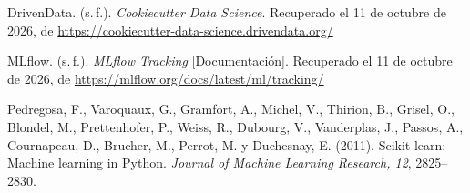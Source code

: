 \documentclass[11pt,letterpaper]{article}
\newcommand{\referencia}[1]{\noindent\hangindent=1.27cm\hangafter=1 #1\par\vspace{4pt}}
\begin{document}
\referencia{DrivenData. (s.\,f.). \textit{Cookiecutter Data Science}. Recuperado el 11 de
octubre de 2026, de \url{https://cookiecutter-data-science.drivendata.org/}}

\referencia{MLflow. (s.\,f.). \textit{MLflow Tracking} [Documentación]. Recuperado el 11 de
octubre de 2026, de \url{https://mlflow.org/docs/latest/ml/tracking/}}

\referencia{Pedregosa, F., Varoquaux, G., Gramfort, A., Michel, V., Thirion, B., Grisel, O.,
Blondel, M., Prettenhofer, P., Weiss, R., Dubourg, V., Vanderplas, J., Passos, A., Cournapeau,
D., Brucher, M., Perrot, M. y Duchesnay, E. (2011). Scikit-learn: Machine learning in Python.
\textit{Journal of Machine Learning Research, 12}, 2825--2830.}
\end{document}
